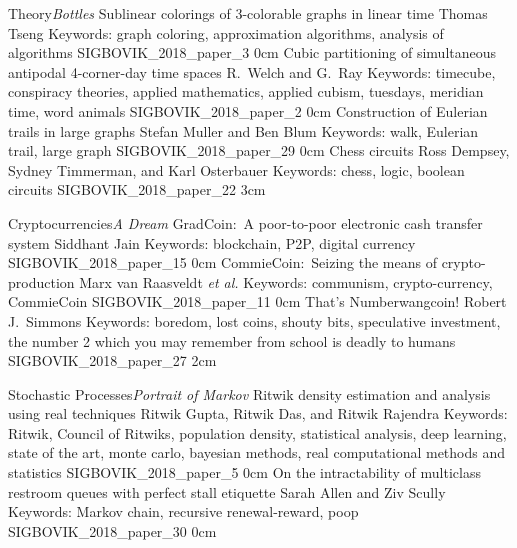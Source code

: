 \renewcommand{\thepage}{\roman{page}}
\setcounter{page}{3}



\newpage
\renewcommand{\thepage}{\arabic{page}}
\setcounter{page}{1}

\addtrack
	{Theory}{\textit{Bottles}}
\addpaper
	{Sublinear colorings of 3-colorable graphs in linear time}
	{Thomas Tseng}
	{Keywords: graph coloring, approximation algorithms, analysis of algorithms}
	{SIGBOVIK_2018_paper_3}
	{0cm}
	{}
\addpaper
	{Cubic partitioning of simultaneous antipodal 4-corner-day time spaces}
	{R.\ Welch and G.\ Ray}
	{Keywords: timecube, conspiracy theories, applied mathematics, applied cubism, tuesdays, meridian time, word animals}
	{SIGBOVIK_2018_paper_2}
	{0cm}
	{}
\addpaper
	{Construction of Eulerian trails in large graphs}
	{Stefan Muller and Ben Blum}
	{Keywords: walk, Eulerian trail, large graph}
	{SIGBOVIK_2018_paper_29}
	{0cm}
	{}
\edef\mainevensidemargin{\the\evensidemargin}
\setlength{\evensidemargin}{0pt}
\addpaper
	{Chess circuits}
	{Ross Dempsey, Sydney Timmerman, and Karl Osterbauer}
	{Keywords: chess, logic, boolean circuits}
	{SIGBOVIK_2018_paper_22}
	{3cm}
	{}
\setlength{\evensidemargin}{\mainevensidemargin}

\addtrack
	{Cryptocurrencies}{\textit{A Dream}}
\addpaper
	{GradCoin:\ A poor-to-poor electronic cash transfer system}
	{Siddhant Jain}
	{Keywords: blockchain, P2P, digital currency}
	{SIGBOVIK_2018_paper_15}
	{0cm}
	{}
\addpaper
	{CommieCoin:\ Seizing the means of crypto-production}
	{Marx van Raasveldt \textit{et al.}}
	{Keywords: communism, crypto-currency, CommieCoin}
	{SIGBOVIK_2018_paper_11}
	{0cm}
	{}
\setlength{\evensidemargin}{0cm}
\addpaper
	{That's Numberwangcoin!}
	{Robert J.\ Simmons}
	{Keywords: boredom, lost coins, shouty bits, speculative investment, the number 2 which you may remember from school is deadly to humans}
	{SIGBOVIK_2018_paper_27}
	{2cm}
	{}
\setlength{\evensidemargin}{\mainevensidemargin}

\addtrack
	{Stochastic Processes}{\textit{Portrait of Markov}}
\addpaper
	{Ritwik density estimation and analysis using real techniques}
	{Ritwik Gupta, Ritwik Das, and Ritwik Rajendra}
	{Keywords: Ritwik, Council of Ritwiks, population density, statistical analysis, deep learning, state of the art, monte carlo, bayesian methods, real computational methods and statistics}
	{SIGBOVIK_2018_paper_5}
	{0cm}
	{}
\addpaper
	{On the intractability of multiclass restroom queues with perfect stall etiquette}
	{Sarah Allen and Ziv Scully}
	{Keywords: Markov chain, recursive renewal-reward, poop}
	{SIGBOVIK_2018_paper_30}
	{0cm}
	{}

